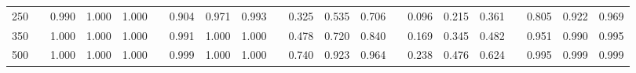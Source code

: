 % 
\begin{tabular}{ccccccccccccccccccccc}
  \hline
  \hline
250 &  & 0.990 & 1.000 & 1.000 &  & 0.904 & 0.971 & 0.993 &  & 0.325 & 0.535 & 0.706 &  & 0.096 & 0.215 & 0.361 &  & 0.805 & 0.922 & 0.969 \\ 
  350 &  & 1.000 & 1.000 & 1.000 &  & 0.991 & 1.000 & 1.000 &  & 0.478 & 0.720 & 0.840 &  & 0.169 & 0.345 & 0.482 &  & 0.951 & 0.990 & 0.995 \\ 
  500 &  & 1.000 & 1.000 & 1.000 &  & 0.999 & 1.000 & 1.000 &  & 0.740 & 0.923 & 0.964 &  & 0.238 & 0.476 & 0.624 &  & 0.995 & 0.999 & 0.999 \\ 
   \hline
\end{tabular}
